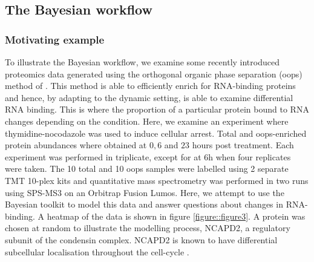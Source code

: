 \documentclass[12pt,english, journal=jpr, layout=twocolumn]{article}
\begin{document}
\subsection{The Bayesian workflow}
\subsubsection{Motivating example}
To illustrate the Bayesian workflow, we examine some recently introduced proteomics data generated using the 
orthogonal organic phase separation (oops) method of \citet{Queiroz::2019}. This method is able to efficiently enrich for RNA-binding proteins and hence, by adapting to the dynamic setting, is able to examine
differential RNA binding. This is where the proportion of a particular protein bound to RNA changes depending on the condition. Here, we examine an experiment where thymidine-nocodazole was used to induce cellular arrest. Total and oops-enriched protein abundances where obtained at $0,6$ and $23$ hours post treatment. Each experiment was performed in triplicate, except for at $6$h when four replicates were taken. The 10 total and 10 oops samples were labelled using 2 separate TMT 10-plex kits and quantitative mass spectrometry was performed in two runs using SPS-MS3 on an Orbitrap Fusion Lumos. Here, we attempt to use the Bayesian toolkit to model this data and answer questions about changes in RNA-binding. A heatmap of the data is shown in figure \ref{figure::figure3}. A protein was chosen at random to illustrate the modelling process, NCAPD2, a regulatory subunit of the condensin complex. NCAPD2 is known to have differential subcellular localisation throughout the cell-cycle \citep{Schmiesing::2000}.
\end{document}
